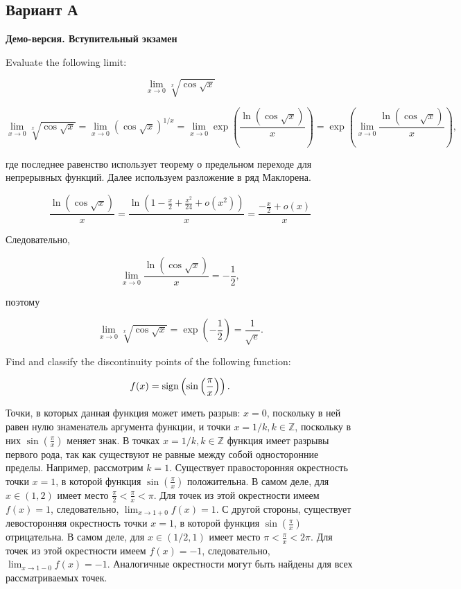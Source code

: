 \documentclass[addpoints, answers]{exam} %
\begin{document}
\subsection{Вариант А}
\textbf{Демо-версия. Вступительный экзамен}
\begin{questions}

\question[10] Evaluate the following limit:

\[
\lim_{x \to 0} \sqrt[x]{\cos \sqrt{x}}
\]

\begin{solution}

\[
\lim_{x \rightarrow 0} \sqrt[x]{\cos \sqrt{x}} = \lim_{x \rightarrow 0} \left({\cos \sqrt{x}}\right) ^{1/x} =  \lim_{x \rightarrow 0} \exp
\left( \frac{\ln (\cos \sqrt{x})}{x} \right) = \exp \left( \lim_{x \rightarrow 0}
\frac{\ln (\cos \sqrt{x})}{x} \right),
\]

\noindent где последнее равенство использует теорему о предельном переходе для непрерывных функций. Далее используем разложение в ряд Маклорена.

\[
\frac{\ln (\cos \sqrt{x})}{x} = \frac{\ln (1-
\frac{x}{2}+\frac{x^2}{24}+o(x^2))}{x} = \frac{-\frac{x}{2}+o(x)}{x}
\]

\noindent Следовательно,

\[
\lim_{x \rightarrow 0} \frac{\ln (\cos \sqrt{x})}{x} = -\frac{1}{2},
\]

\noindent поэтому

\[
\lim_{x \rightarrow 0} \sqrt[x]{\cos \sqrt{x}} = \exp \left( -\frac{1}{2}\right) = \frac{1}{\sqrt{e}}.
\]
\end{solution}

\question[10] Find and classify the discontinuity points of the following function:

\[
f(x) = {\operatorname{sign}} \left(\sin \left( \frac{\pi}{x}\right)\right).
\]

\begin{solution}
Точки, в которых данная функция может иметь разрыв: $x=0$, поскольку в ней равен нулю знаменатель аргумента функции, и точки $x=1/k, k \in \mathbb{Z}$, поскольку в них $\sin \left( \frac{\pi}{x}\right)$ меняет знак. В точках $x=1/k, k \in \mathbb{Z}$ функция имеет разрывы первого рода, так как существуют не равные между собой односторонние пределы. Например, рассмотрим $k=1$. Существует правосторонняя окрестность точки $x=1$, в которой функция $\sin \left( \frac{\pi}{x} \right)$ положительна. В самом деле, для $x \in (1,2)$ имеет место $\frac{\pi}{2} < \frac{\pi}{x} < \pi$. Для точек из этой окрестности имеем $f(x) = 1$, следовательно, $\lim_{x \rightarrow 1+0} f(x) = 1$. С другой стороны, существует левосторонняя окрестность точки $x=1$, в которой функция $\sin \left( \frac{\pi}{x} \right)$ отрицательна. В самом деле, для $x \in (1/2,1)$ имеет место $\pi < \frac{\pi}{x} < 2 \pi$. Для точек из этой окрестности имеем $f(x) = -1$, следовательно, $\lim_{x \rightarrow 1-0} f(x) = -1$. Аналогичные окрестности могут быть найдены для всех рассматриваемых точек.




\end{solution}
\end{questions}
\end{document}
